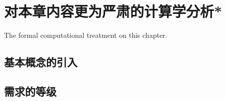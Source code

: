 \section{对本章内容更为严肃的计算学分析*}

The formal computational treatment on this chapter.
\subsection{基本概念的引入}

\subsection{需求的等级}
